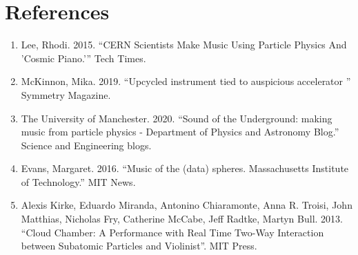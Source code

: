 \section{\textbf{References}}

\begin{enumerate}
\item Lee, Rhodi. 2015. “CERN Scientists Make Music Using Particle Physics And 'Cosmic Piano.'” Tech Times.

\item McKinnon, Mika. 2019. “Upcycled instrument tied to auspicious accelerator ” Symmetry Magazine.

\item The University of Manchester. 2020. “Sound of the Underground: making music from particle physics - Department of Physics and Astronomy Blog.” Science and Engineering blogs.

\item Evans, Margaret. 2016. “Music of the (data) spheres. Massachusetts Institute of Technology.” MIT News. 

\item Alexis Kirke, Eduardo Miranda, Antonino Chiaramonte, Anna R. Troisi, John Matthias, Nicholas Fry, Catherine McCabe, Jeff Radtke, Martyn Bull. 2013. “Cloud Chamber: A Performance with Real Time Two-Way Interaction between Subatomic Particles and Violinist”. MIT Press.

\end{enumerate}